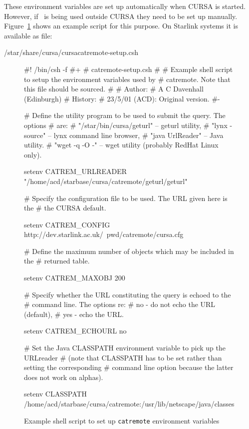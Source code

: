\documentclass[twoside,11pt]{starlink}
\providecommand{\catremote}{\htmlref{\texttt{catremote}}{CATREMOTE}}
\begin{document}
These environment variables are set up automatically when CURSA is started.
However, if \catremote\ is being used outside CURSA they need to be
set up manually.
Figure~\ref{SETENVAR} shows an example script for this purpose.  On
Starlink systems it is available as file:

\begin{terminalv}
/star/share/cursa/cursacatremote-setup.csh
\end{terminalv}

\begin{figure}[htbp]
\latex{\begin{small}}
\begin{terminalv}
#! /bin/csh -f
#+
# catremote-setup.csh
#
# Example shell script to setup the environment variables used by
# catremote.  Note that this file should be sourced.
#
# Author:
#   A C Davenhall (Edinburgh)
# History:
#   23/5/01 (ACD): Original version.
#-

#  Define the utility program to be used to submit the query.  The options
#  are:
#    "/star/bin/cursa/geturl" -- geturl utility,
#    "lynx -source"           -- lynx command line browser,
#    "java  UrlReader"        -- Java utility.
#    "wget -q -O -"           -- wget utility (probably RedHat Linux only).

setenv  CATREM_URLREADER "/home/acd/starbase/cursa/catremote/geturl/geturl"

#  Specify the configuration file to be used.  The URL given here is the
#  the CURSA default.

setenv  CATREM_CONFIG  http://dev.starlink.ac.uk/~pwd/catremote/cursa.cfg

#  Define the maximum number of objects which may be included in the
#  returned table.

setenv  CATREM_MAXOBJ  200

#  Specify whether the URL constituting the query is echoed to the
#  command line.  The options re:
#    no   -  do not echo the URL (default),
#    yes  -  echo the URL.

setenv  CATREM_ECHOURL no

#  Set the Java CLASSPATH environment variable to pick up the URLreader
#  (note that CLASSPATH has to be set rather than setting the corresponding
#  command line option because the latter does not work on alphas).

setenv CLASSPATH /home/acd/starbase/cursa/catremote:/usr/lib/netscape/java/classes
\end{terminalv}
\latex{\end{small}}

\begin{quote}
\caption{Example shell script to set up \texttt{catremote} environment
variables  \label{SETENVAR} }
\end{quote}

\end{figure}
\end{document}
